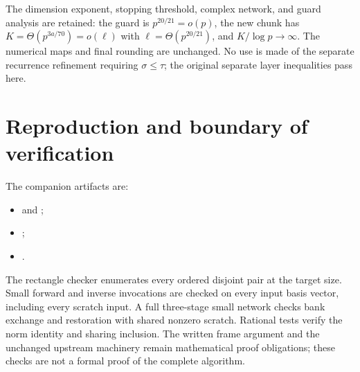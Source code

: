 \documentclass[11pt]{article}
\begin{document}
The dimension exponent, stopping threshold, complex network, and guard
analysis are retained: the guard is $p^{20/21}=o(p)$, the new chunk has
$K=\Theta(p^{3a/70})=o(\ell)$ with $\ell=\Theta(p^{20/21})$, and
$K/\log p\to\infty$. The numerical maps and final rounding are unchanged.
No use is made of the separate recurrence refinement requiring
$\sigma\le\tau$; the original separate layer inequalities pass here.

\section{Reproduction and boundary of verification}
The companion artifacts are:
\begin{itemize}
\item {} and ;
\item {};
\item {}.
\end{itemize}
The rectangle checker enumerates every
ordered disjoint pair at the target size. Small forward and inverse invocations
are checked on every input basis vector, including every scratch input. A full
three-stage small network checks bank exchange and restoration with shared
nonzero scratch. Rational tests verify the norm identity and sharing inclusion.
The written frame argument and the unchanged upstream machinery remain
mathematical proof obligations; these checks are not a formal proof of the
complete algorithm.
\end{document}
